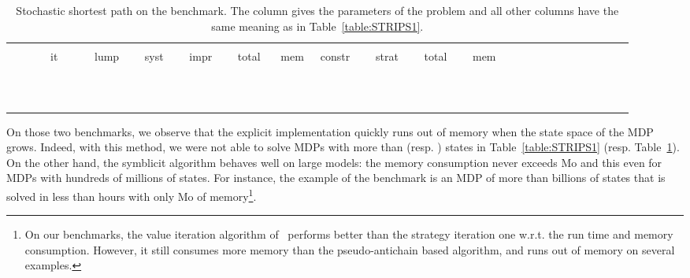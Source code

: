 \begin{table}[h!]
	\caption{Stochastic shortest path on the  benchmark. The column  gives the parameters of the problem and all other columns have the same meaning as in Table~\ref{table:STRIPS1}.}
	\label{table:STRIPS2}
	\centering
	\scriptsize
 		\begin{tabular}{|r|r|r||r|r|r|r|r|r|r||r|r|r|r|r|r|r|r|r|r|r|r|r|r|r|}
		\hline
	  	& & & \multicolumn{7}{|c||}{{\small }} & \multicolumn{4}{|c|}{{\small }}\rule[-2pt]{0pt}{10pt}\\
		 &   &   & \ it \  &  & \ lump  \ &  \ syst \  &  \ impr  \ & \  total \  & mem & \ constr \  & \ strat \ & \ total \ & \ mem\ \rule[-3pt]{0pt}{10pt}\\
\hline\hline
 &  &  &  &  &  &  &   &  &  &  &   &  & \rule[-3pt]{0pt}{10pt}\\
 &  &  &  &  &  &  &   &  &  &  &   &  & \rule[-3pt]{0pt}{10pt}\\
 &  &  &  &  &  &  &   &  &  &  &   &  & \rule[-3pt]{0pt}{10pt}\\
 &  &  &  &  &  &  &   &  &  &  &   &  & \rule[-3pt]{0pt}{10pt}\\
\hline  &  &  &  &  &  &  &   &  &  &  &   &  & \rule[-3pt]{0pt}{10pt}\\
 &  &  &  &  &  &  &   &  &  &  &   &  & \rule[-3pt]{0pt}{10pt}\\
 &  &  &  &  &  &  &   &  &  &  &   &  & \rule[-3pt]{0pt}{10pt}\\
 &  &  &  &  &  &  &   &  &  &  &   &  & \rule[-3pt]{0pt}{10pt}\\
 &  &  &  &  &  &  &   &  &  &  &   &  & \rule[-3pt]{0pt}{10pt}\\
\hline  &  &  &  &  &  &  &   &  &  &  &   &  & \rule[-3pt]{0pt}{10pt}\\
 &  &  &  &  &  &  &   &  &  &  &   &  & \rule[-3pt]{0pt}{10pt}\\
\hline
		\end{tabular}
	\normalsize
\end{table}

On those two benchmarks, we observe that the explicit implementation quickly runs out of memory when the state space of the MDP grows. Indeed, with this method, we were not able to solve MDPs with more than  (resp. ) states in Table~\ref{table:STRIPS1} (resp. Table~\ref{table:STRIPS2}). On the other hand, the symblicit algorithm behaves well on large models: the memory consumption never exceeds Mo and this even for MDPs with hundreds of millions of states. For instance, the example  of the  benchmark is an MDP of more than  billions of states that is solved in less than  hours with only Mo of memory\footnote{On our benchmarks, the value iteration algorithm of ~performs better than the strategy iteration one w.r.t. the run time and memory consumption. However, it still consumes more memory than the pseudo-antichain based algorithm, and runs out of memory on several examples.}.


